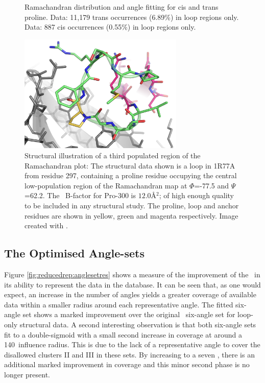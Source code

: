 \begin{figure}[htbp]
\begin{center}
\caption[Ramachanran distribution and angle fitting for proline]%
{Ramachandran distribution and angle fitting for cis and trans proline.
Data: 11,179 trans occurrences (6.89\%) in loop regions only. Data: 887 cis occurrences (0.55\%) in loop regions only.}
    \label{fig:reducedrep:ramachandran:pro}
  \end{center}
\end{figure}


\begin{figure}[hptb]
\begin{center}
\includegraphics[width=0.7\textwidth]{05-ReducedRep/pro_reg3/pro_reg3.png}
\caption[Structural illustration of a third populated region of the Ramachandran plot]{Structural illustration of a third populated region of the Ramachandran plot: The structural data shown is a  loop in 1R77A from residue 297, containing a proline residue occupying the central low-population
region of the Ramachandran map at $\Phi$=-77.5 and $\Psi$=62.2.  The \ca\ B-factor for Pro-300 is $12.0$\AA$^2$;  of high enough quality
to be included in any structural study.
The proline, loop and anchor residues are shown in yellow, green and magenta
respectively. Image created with \pymolV. }
\label{fig:reducedrep:proreg3}
\end{center}
\end{figure}


\subsection{The Optimised Angle-sets}
\label{section:reduced_rep:optimised_angleset}

Figure \ref{fig:reducedrep:anglesetres} shows a measure of the improvement of the \angleset\ in its ability to represent the data in the database. It can be seen that, as one would expect, an increase in the number of angles yields a greater coverage of available data within a smaller radius around each representative angle. The fitted six-angle set shows a marked improvement over the original \raft\ six-angle set for loop-only structural data. A second interesting observation is that both six-angle sets fit to a double-sigmoid with a small second increase in coverage at around a 140\degree\ influence radius. This is due to the lack of a representative angle to cover the disallowed clusters II and III in these sets. By increasing to a seven \angleset, there is an additional marked improvement in coverage and this minor second phase is no longer present.

